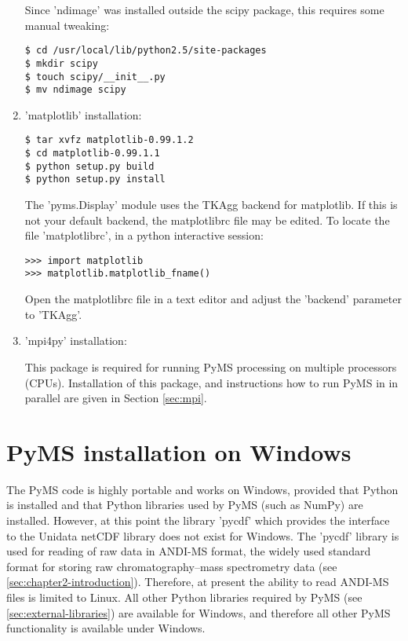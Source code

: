 \begin{enumerate}
\noindent
Since 'ndimage' was installed outside the scipy package, this requires
some manual tweaking:

\begin{verbatim}
$ cd /usr/local/lib/python2.5/site-packages
$ mkdir scipy
$ touch scipy/__init__.py
$ mv ndimage scipy
\end{verbatim}

\item 'matplotlib' installation:

\begin{verbatim}
$ tar xvfz matplotlib-0.99.1.2
$ cd matplotlib-0.99.1.1
$ python setup.py build
$ python setup.py install
\end{verbatim}

\noindent
The 'pyms.Display' module uses the TKAgg backend for matplotlib. If
this is not your default backend, the matplotlibrc file may be edited.
To locate the file 'matplotlibrc', in a python interactive session:

\begin{verbatim}
>>> import matplotlib
>>> matplotlib.matplotlib_fname()
\end{verbatim}

\noindent
Open the matplotlibrc file in a text editor and adjust the 'backend'
parameter to 'TKAgg'.

\item 'mpi4py' installation:

This package is required for running PyMS processing on multiple processors
(CPUs). Installation of this package, and instructions how to run PyMS in
in parallel are given in Section \ref{sec:mpi}. 


\end{enumerate}

\section{PyMS installation on Windows}

The PyMS code is highly portable and works on Windows, provided that
Python is installed and that Python libraries used by PyMS (such as
NumPy) are installed. However, at this point the library 'pycdf'
which provides the interface to the Unidata netCDF library does
not exist for Windows. The 'pycdf' library is used for reading of
raw data in ANDI-MS format, the widely used standard format for
storing raw chromatography--mass spectrometry data
(see \ref{sec:chapter2-introduction}). Therefore, at present the
ability to read ANDI-MS files is limited to Linux. All other
Python libraries required by PyMS (see \ref{sec:external-libraries})
are available for Windows, and therefore all other PyMS functionality
is available under Windows.

